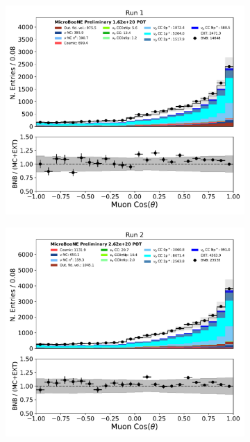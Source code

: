\begin{figure}[H] 
\begin{center}
    \begin{subfigure}[b]{0.35\textwidth}
        \centering
        \includegraphics[width=1.00\textwidth]{NuMuCCsel/Images/Ryan/Run1/trk_cos_theta_v_08052020_full_samples_longest_noCRT_event_category.pdf}
    \end{subfigure}
    \begin{subfigure}[b]{0.35\textwidth}
        \centering
        \includegraphics[width=1.00\textwidth]{NuMuCCsel/Images/Ryan/Run2/trk_cos_theta_v_08052020_full_samples_longest_noCRT_event_category.pdf}

\end{subfigure}
\end{center}
\end{figure}

